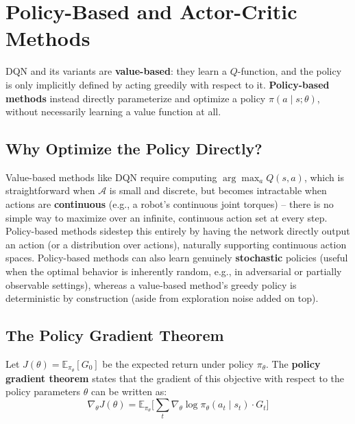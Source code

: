 \documentclass[12pt,a4paper]{article}
\begin{document}
\newpage

\section{Policy-Based and Actor-Critic Methods}

DQN and its variants are \textbf{value-based}: they learn a $Q$-function, and the policy is only implicitly defined by acting greedily with respect to it. \textbf{Policy-based methods} instead directly parameterize and optimize a policy $\pi(a\mid s;\theta)$, without necessarily learning a value function at all.

\subsection{Why Optimize the Policy Directly?}

\begin{keyidea}
Value-based methods like DQN require computing $\arg\max_a Q(s,a)$, which is straightforward when $\mathcal{A}$ is small and discrete, but becomes intractable when actions are \textbf{continuous} (e.g., a robot's continuous joint torques) -- there is no simple way to maximize over an infinite, continuous action set at every step. Policy-based methods sidestep this entirely by having the network directly output an action (or a distribution over actions), naturally supporting continuous action spaces. Policy-based methods can also learn genuinely \textbf{stochastic} policies (useful when the optimal behavior is inherently random, e.g., in adversarial or partially observable settings), whereas a value-based method's greedy policy is deterministic by construction (aside from exploration noise added on top).
\end{keyidea}

\subsection{The Policy Gradient Theorem}

\begin{defbox}
Let $J(\theta) = \mathbb{E}_{\pi_\theta}[G_0]$ be the expected return under policy $\pi_\theta$. The \textbf{policy gradient theorem} states that the gradient of this objective with respect to the policy parameters $\theta$ can be written as:
\[
\nabla_\theta J(\theta) = \mathbb{E}_{\pi_\theta}\Big[\sum_t \nabla_\theta \log \pi_\theta(a_t\mid s_t) \cdot G_t\Big]
\]
\end{defbox}
\end{document}
